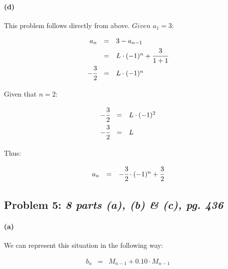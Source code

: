 \documentclass[a4paper]{article}
\begin{document}
\paragraph{(d)} This problem follows directly from above. $\textit{Given } \mathit{a_1 = 3}$:

\begin{equation*}
\begin{array}{rcl}
a_n & = & 3 - a_{n-1} \\[.03in]
& = & L \cdot (-1)^n + \cfrac{3}{1+1} \\[.08in]
- \cfrac{3}{2} & = & L \cdot (-1)^n \\[.08in]
\end{array}
\end{equation*}

Given that $n=2$:

\begin{equation*}
\begin{array}{rcl}
- \cfrac{3}{2} & = & L \cdot (-1)^2 \\[.08in]
- \cfrac{3}{2} & = & L \\[.08in]
\end{array}
\end{equation*}

Thus:

\begin{equation}
\begin{array}{rcl}
a_n & = & - \cfrac{3}{2} \cdot (-1)^n + \cfrac{3}{2} \\[.08in]
\end{array}
\end{equation}

\subsection*{Problem 5: \textit{8 parts (a), (b) \& (c), pg. 436}} 

\paragraph{(a)} We can represent this situation in the following way:

\begin{equation*}
\begin{array}{rcl}
b_n & = & M_{n-1} + 0.10 \cdot M_{n-1}  \\[.08in]
\end{array}
\end{equation*}
\end{document}
